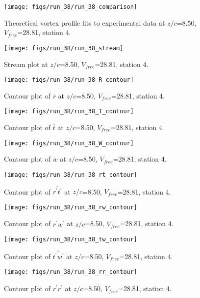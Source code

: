 \begin{figure}[H]
\centering
\texttt{[image: figs/run\_38/run\_38\_comparison]}
\caption{Theoretical vortex profile fits to experimental data at $z/c$=8.50, $V_{free}$=28.81, station 4.}
\end{figure}


\begin{figure}[H]
\centering
\texttt{[image: figs/run\_38/run\_38\_stream]}
\caption{Stream plot at $z/c$=8.50, $V_{free}$=28.81, station 4.}
\end{figure}


\begin{figure}[H]
\centering
\texttt{[image: figs/run\_38/run\_38\_R\_contour]}
\caption{Contour plot of $\overline{r}$ at $z/c$=8.50, $V_{free}$=28.81, station 4.}
\end{figure}


\begin{figure}[H]
\centering
\texttt{[image: figs/run\_38/run\_38\_T\_contour]}
\caption{Contour plot of $\overline{t}$ at $z/c$=8.50, $V_{free}$=28.81, station 4.}
\end{figure}


\begin{figure}[H]
\centering
\texttt{[image: figs/run\_38/run\_38\_W\_contour]}
\caption{Contour plot of $\overline{w}$ at $z/c$=8.50, $V_{free}$=28.81, station 4.}
\end{figure}


\begin{figure}[H]
\centering
\texttt{[image: figs/run\_38/run\_38\_rt\_contour]}
\caption{Contour plot of $\overline{r^\prime t^\prime}$ at $z/c$=8.50, $V_{free}$=28.81, station 4.}
\end{figure}


\begin{figure}[H]
\centering
\texttt{[image: figs/run\_38/run\_38\_rw\_contour]}
\caption{Contour plot of $\overline{r^\prime w^\prime}$ at $z/c$=8.50, $V_{free}$=28.81, station 4.}
\end{figure}


\begin{figure}[H]
\centering
\texttt{[image: figs/run\_38/run\_38\_tw\_contour]}
\caption{Contour plot of $\overline{t^\prime w^\prime}$ at $z/c$=8.50, $V_{free}$=28.81, station 4.}
\end{figure}


\begin{figure}[H]
\centering
\texttt{[image: figs/run\_38/run\_38\_rr\_contour]}
\caption{Contour plot of $\overline{r^\prime r^\prime}$ at $z/c$=8.50, $V_{free}$=28.81, station 4.}
\end{figure}


